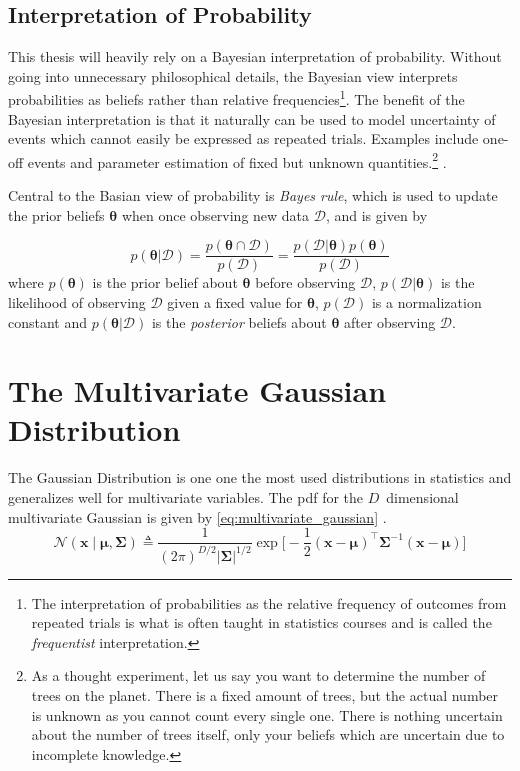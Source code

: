 \subsection{Interpretation of Probability}
This thesis will heavily rely on a Bayesian interpretation of probability. Without going into unnecessary philosophical details, the Bayesian view interprets probabilities as beliefs rather than relative frequencies\footnote{The interpretation of probabilities as the relative frequency of outcomes from repeated trials is what is often taught in statistics courses and is called the \textit{frequentist} interpretation.}. 
The benefit of the Bayesian interpretation is that it naturally can be used to model uncertainty of events which cannot easily be expressed as repeated trials. Examples include one-off events and parameter estimation of fixed but unknown quantities.\footnote{As a thought experiment, let us say you want to determine the number of trees on the planet. There is a fixed amount of trees, but the actual number is unknown as you cannot count every single one. There is nothing uncertain about the number of trees itself, only your beliefs which are uncertain due to incomplete knowledge.} \cite{murphy}.

Central to the Basian view of probability is \textit{Bayes rule}, which is used to update the prior beliefs $\boldsymbol{\theta}$ when once observing new data $\mathcal{D}$, and is given by

\begin{equation}
    p(\boldsymbol{\theta} | \mathcal{D}) = \frac{p(\boldsymbol{\theta} \cap \mathcal{D})}{p(\mathcal{D})} = \frac{p(\mathcal{D} | \boldsymbol{\theta}) p(\boldsymbol{\theta})}{p(\mathcal{D})}
\end{equation}
where $p(\boldsymbol{\theta})$ is the prior belief about $\boldsymbol{\theta}$ before observing $\mathcal{D}$, $p(\mathcal{D} | \boldsymbol{\theta})$ is the likelihood of observing $\mathcal{D}$ given a fixed value for $\boldsymbol{\theta}$, $p(\mathcal{D})$ is a normalization constant and $p(\boldsymbol{\theta} | \mathcal{D})$ is the \textit{posterior} beliefs about $\boldsymbol{\theta}$ after observing $\mathcal{D}$. 




\section{The Multivariate Gaussian Distribution}
The Gaussian Distribution is one one the most used distributions in statistics \cite{murphy} and generalizes well for multivariate variables. The pdf for the $D$ dimensional multivariate Gaussian is given by \cref{eq:multivariate_gaussian} \cite{murphy,rasmussen}.
\begin{equation}\label{eq:multivariate_gaussian}
    \mathcal{N}(\boldsymbol{x} \; | \; \boldsymbol{\mu}, \boldsymbol{\Sigma}) \triangleq \frac{1}{(2 \pi)^{D/2} |\boldsymbol{\Sigma} | ^{1/2}} \exp \bigg[- \frac{1}{2} (\boldsymbol{x} - \boldsymbol{\mu})^\intercal \boldsymbol{\Sigma}^{-1}(\boldsymbol{x} - \boldsymbol{\mu})\bigg]
\end{equation}
